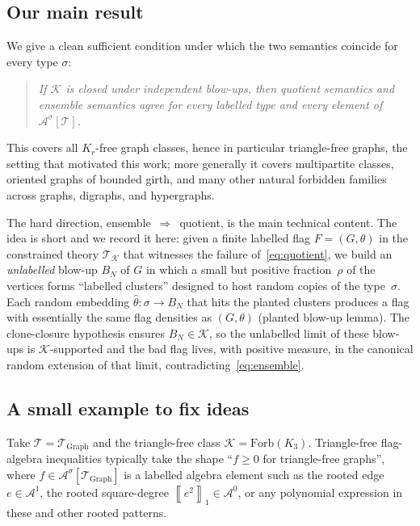 \documentclass[11pt]{article}
\theoremstyle{definition}
\newcommand{\A}{\mathcal{A}}
\newcommand{\K}{\mathcal{K}}
\newcommand{\T}{\mathcal{T}}
\newcommand{\avg}[2]{\left\llbracket #1 \right\rrbracket_{#2}}
\begin{document}
\subsection{Our main result}

We give a clean sufficient condition under which the two semantics
coincide for every type $\sigma$:

\begin{quote}\em
  If $\K$ is closed under independent blow-ups, then quotient semantics
  and ensemble semantics agree for every labelled type and every element
  of $\A^\sigma[\T]$.
\end{quote}

This covers all $K_r$-free graph classes, hence in particular triangle-free
graphs, the setting that motivated this work; more generally it covers
multipartite classes, oriented graphs of bounded girth, and many other
natural forbidden families across graphs, digraphs, and hypergraphs.

The hard direction, ensemble~$\Rightarrow$~quotient, is the main
technical content.  The idea is short and we record it here: given a
finite labelled flag $F=(G,\theta)$ in the constrained theory $\T_\K$
that witnesses the failure of~\eqref{eq:quotient}, we build an
\emph{unlabelled} blow-up $B_N$ of $G$ in which a small but positive
fraction~$\rho$ of the vertices forms ``labelled clusters'' designed to
host random copies of the type~$\sigma$.  Each random embedding
$\widehat\theta:\sigma\to B_N$ that hits the planted clusters produces a
flag with essentially the same flag densities as $(G,\theta)$
(planted blow-up lemma).  The clone-closure hypothesis ensures
$B_N\in\K$, so the unlabelled limit of these blow-ups is $\K$-supported
and the bad flag lives, with positive measure, in the canonical random
extension of that limit, contradicting~\eqref{eq:ensemble}.

\subsection{A small example to fix ideas}

Take $\T=\T_{\mathrm{Graph}}$ and the triangle-free class
$\K=\mathrm{Forb}(K_3)$.  Triangle-free flag-algebra inequalities
typically take the shape ``$f\ge 0$ for triangle-free graphs'', where
$f\in\A^\sigma[\T_{\mathrm{Graph}}]$ is a labelled algebra element such
as the rooted edge $e\in\A^1$, the rooted square-degree
$\avg{e^2}{1}\in\A^0$, or any polynomial expression in these and other
rooted patterns.
\end{document}
